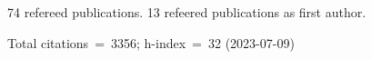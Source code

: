 74 refereed publications. 13 refeered publications as first author.

Total citations~=~3356; h-index~=~32 (2023-07-09)